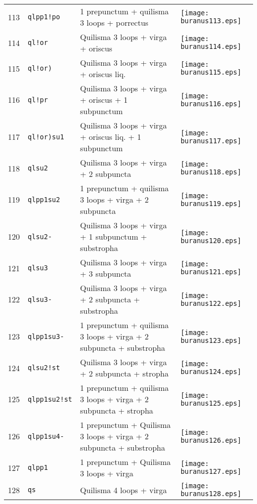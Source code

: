 \documentclass{scrarticle}
\begin{document}
\begin{longtable}{l|l|l|l}
113 & \texttt{qlpp1!po} & 1 prepunctum + quilisma 3 loops + porrectus & \texttt{[image: buranus113.eps]} \\
114 & \texttt{ql!or} & Quilisma 3 loops + virga + oriscus & \texttt{[image: buranus114.eps]} \\
115 & \texttt{ql!or)} & Quilisma 3 loops + virga + oriscus liq. & \texttt{[image: buranus115.eps]} \\
116 & \texttt{ql!pr} & Quilisma 3 loops + virga + oriscus + 1 subpunctum & \texttt{[image: buranus116.eps]} \\
117 & \texttt{ql!or)su1} & Quilisma 3 loops + virga + oriscus liq. + 1 subpunctum & \texttt{[image: buranus117.eps]} \\
118 & \texttt{qlsu2} & Quilisma 3 loops + virga + 2 subpuncta & \texttt{[image: buranus118.eps]} \\
119 & \texttt{qlpp1su2} & 1 prepunctum + quilisma 3 loops + virga + 2 subpuncta & \texttt{[image: buranus119.eps]} \\
120 & \texttt{qlsu2-} & Quilisma 3 loops + virga + 1 subpunctum + substropha & \texttt{[image: buranus120.eps]} \\
121 & \texttt{qlsu3} & Quilisma 3 loops + virga + 3 subpuncta & \texttt{[image: buranus121.eps]} \\
122 & \texttt{qlsu3-} & Quilisma 3 loops + virga + 2 subpuncta + substropha & \texttt{[image: buranus122.eps]} \\
123 & \texttt{qlpp1su3-} & 1 prepunctum + quilisma 3 loops + virga + 2 subpuncta + substropha & \texttt{[image: buranus123.eps]} \\
124 & \texttt{qlsu2!st} & Quilisma 3 loops + virga + 2 subpuncta + stropha & \texttt{[image: buranus124.eps]} \\
125 & \texttt{qlpp1su2!st} & 1 prepunctum + quilisma 3 loops + virga + 2 subpuncta + stropha & \texttt{[image: buranus125.eps]} \\
126 & \texttt{qlpp1su4-} & 1 prepunctum + Quilisma 3 loops + virga + 2 subpuncta + substropha & \texttt{[image: buranus126.eps]} \\
127 & \texttt{qlpp1} & 1 prepunctum + Quilisma 3 loops + virga & \texttt{[image: buranus127.eps]} \\
128 & \texttt{qs} & Quilisma 4 loops + virga & \texttt{[image: buranus128.eps]} \\

\end{longtable}
\end{document}
